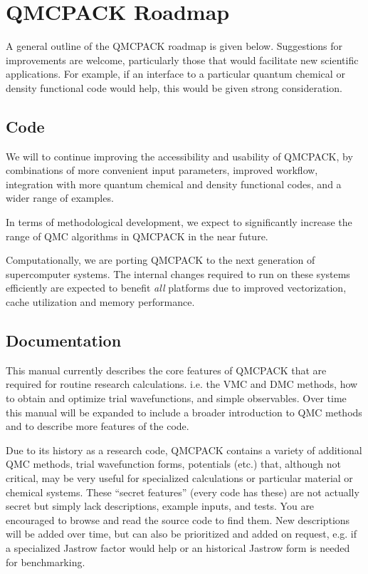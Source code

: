 \section{QMCPACK Roadmap}
\label{sec:roadmap}

A general outline of the QMCPACK roadmap is given below. Suggestions
for improvements are welcome, particularly those that would facilitate new
scientific applications. For example, if an interface to a particular
quantum chemical or density functional code would help, this would be
given strong consideration.

\subsection{Code}

We will to continue improving the accessibility and usability of
QMCPACK, by combinations of more convenient input parameters, improved
workflow, integration with more quantum chemical and density
functional codes, and a wider range of examples.

In terms of methodological development, we expect to significantly
increase the range of QMC algorithms in QMCPACK in the near future.

Computationally, we are porting QMCPACK to the next generation of
supercomputer systems. The internal changes required to run on these
systems efficiently are expected to benefit \emph{all} platforms due
to improved vectorization, cache utilization and memory performance.

\subsection{Documentation}

This manual currently describes the core features of QMCPACK that are
required for routine research calculations. i.e. the VMC and DMC
methods, how to obtain and optimize trial wavefunctions, and simple
observables. Over time this manual will be expanded to include a
broader introduction to QMC methods and to describe more features of
the code.

Due to its history as a research code, QMCPACK contains a variety of
additional QMC methods, trial wavefunction forms, potentials (etc.)
that, although not critical, may be very useful for specialized
calculations or particular material or chemical systems. These
``secret features'' (every code has these) are not actually secret but
simply lack descriptions, example inputs, and tests. You are
encouraged to browse and read the source code to find them. New
descriptions will be added over time, but can also be prioritized and
added on request, e.g. if a specialized Jastrow factor would help or
an historical Jastrow form is needed for benchmarking.


